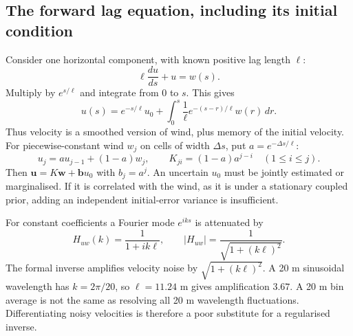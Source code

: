 \documentclass[11pt,a4paper]{article}
\numberwithin{equation}{section}
\begin{document}
\subsection{The forward lag equation, including its initial condition}
Consider one horizontal component, with known positive lag length $\ell$:
\begin{equation}
 \ell\frac{du}{ds}+u=w(s).
\end{equation}
Multiply by $e^{s/\ell}$ and integrate from $0$ to $s$. This gives
\begin{equation}
 \boxed{u(s)=e^{-s/\ell}u_0+
 \int_0^s\frac1\ell e^{-(s-r)/\ell}w(r)\,dr.}
\end{equation}
Thus velocity is a smoothed version of wind, plus memory of the initial velocity. For piecewise-constant wind $w_j$ on cells of width $\Delta s$, put $a=e^{-\Delta s/\ell}$:
\begin{equation}
 u_j=au_{j-1}+(1-a)w_j,\qquad
 K_{ji}=(1-a)a^{j-i}\quad(1\leq i\leq j).
\end{equation}
Then $\mathbf u=K\mathbf w+\mathbf b u_0$ with $b_j=a^j$. An uncertain $u_0$ must be jointly estimated or marginalised. If it is correlated with the wind, as it is under a stationary coupled prior, adding an independent initial-error variance is insufficient.

For constant coefficients a Fourier mode $e^{iks}$ is attenuated by
\begin{equation}
 H_{uw}(k)=\frac1{1+ik\ell},\qquad |H_{uw}|=\frac1{\sqrt{1+(k\ell)^2}}.
\end{equation}
The formal inverse amplifies velocity noise by $\sqrt{1+(k\ell)^2}$. A 20 m sinusoidal wavelength has $k=2\pi/20$, so $\ell=11.24$ m gives amplification $3.67$. A 20 m bin average is not the same as resolving all 20 m wavelength fluctuations. Differentiating noisy velocities is therefore a poor substitute for a regularised inverse.
\end{document}
